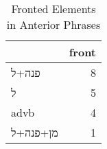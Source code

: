 \begin{table}[htbp!]
\centering
\caption{Fronted Elements in Anterior Phrases}
\label{table:ant_front}
\begin{tabular}{lr}
\toprule
{} &  front \\
\midrule
\texthebrew{פנה}+\texthebrew{ל}                 &      8 \\
\texthebrew{ל}                                  &      5 \\
advb                                            &      4 \\
\texthebrew{מן}+\texthebrew{פנה}+\texthebrew{ל} &      1 \\
\bottomrule
\end{tabular}
\end{table}
